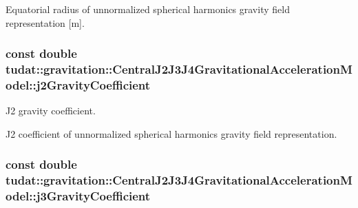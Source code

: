 Equatorial radius of unnormalized spherical harmonics gravity field representation \mbox{[}m\mbox{]}. 
\subsubsection[{\texorpdfstring{j2\+Gravity\+Coefficient}{j2GravityCoefficient}}]{\setlength{\rightskip}{0pt plus 5cm}const double tudat\+::gravitation\+::\+Central\+J2\+J3\+J4\+Gravitational\+Acceleration\+Model\+::j2\+Gravity\+Coefficient\hspace{0.3cm}{\ttfamily [protected]}}\hypertarget{classtudat_1_1gravitation_1_1CentralJ2J3J4GravitationalAccelerationModel_a071e61410c0e357127de1b14dc8e8fa3}{}\label{classtudat_1_1gravitation_1_1CentralJ2J3J4GravitationalAccelerationModel_a071e61410c0e357127de1b14dc8e8fa3}


J2 gravity coefficient. 

J2 coefficient of unnormalized spherical harmonics gravity field representation. 
\subsubsection[{\texorpdfstring{j3\+Gravity\+Coefficient}{j3GravityCoefficient}}]{\setlength{\rightskip}{0pt plus 5cm}const double tudat\+::gravitation\+::\+Central\+J2\+J3\+J4\+Gravitational\+Acceleration\+Model\+::j3\+Gravity\+Coefficient\hspace{0.3cm}{\ttfamily [protected]}}\hypertarget{classtudat_1_1gravitation_1_1CentralJ2J3J4GravitationalAccelerationModel_af50f73459c35cf1861773b3e90a48e6d}{}\label{classtudat_1_1gravitation_1_1CentralJ2J3J4GravitationalAccelerationModel_af50f73459c35cf1861773b3e90a48e6d}


